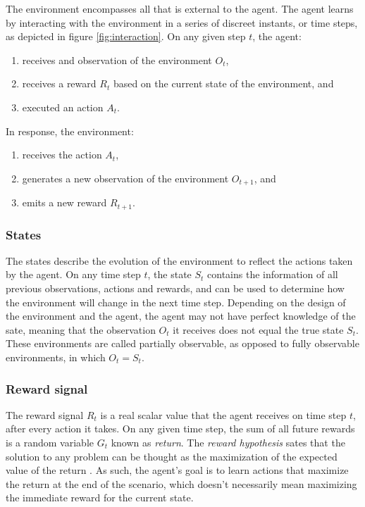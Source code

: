 The environment encompasses all that is external to the agent. The agent learns by interacting with the environment in a series of discreet instants, or time steps, as depicted in figure \ref{fig:interaction}. On any given step $t$, the agent:

\begin{enumerate}
    \item receives and observation of the environment $O_t$,
    \item receives a reward $R_t$ based on the current state of the environment, and
    \item executed an action $A_t$.
\end{enumerate}

In response, the environment:

\begin{enumerate}
    \item receives the action $A_t$,
    \item generates a new observation of the environment $O_{t+1}$, and
    \item emits a new reward $R_{t+1}$.
\end{enumerate}

\subsubsection{States}

The states describe the evolution of the environment to reflect the actions taken by the agent. On any time step $t$, the state $S_t$ contains the information of all previous observations, actions and rewards, and can be used to determine how the environment will change in the next time step. Depending on the design of the environment and the agent, the agent may not have perfect knowledge of the sate, meaning that the observation $O_t$ it receives does not equal the true state $S_t$. These environments are called partially observable, as opposed to fully observable environments, in which $O_t = S_t$.

\subsubsection{Reward signal}

The reward signal $R_t$ is a real scalar value that the agent receives on time step $t$, after every action it takes. On any given time step, the sum of all future rewards is a random variable $G_t$ known as \textit{return}. The \textit{reward hypothesis} sates that the solution to any problem can be thought as the maximization of the expected value of the return \cite{Sutton:2014}. As such, the agent's goal is to learn actions that maximize the return at the end of the scenario, which doesn't necessarily mean maximizing the immediate reward for the current state.

